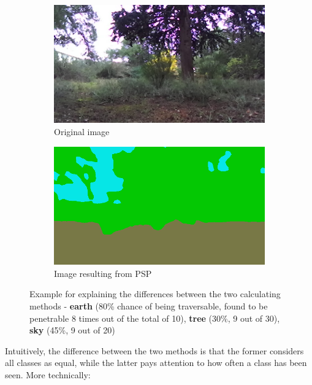 \documentclass[12pt,a4paper,table,dvipsnames,tikz]{report}
\newcommand{\acronym}{\MakeUppercase}
\newcommand{\class}[1]{\textbf{\textcolor{#1}{#1}}} %
\begin{document}
	\begin{figure}[h!]
		\centering
		\begin{subfigure}[b]{0.45\textwidth}
			\includegraphics[width=\textwidth]{44_40_0050or}
			\caption{Original image}
			\label{fig:meth:or}
		\end{subfigure}
		\begin{subfigure}[b]{0.45\textwidth}
			\includegraphics[width=\textwidth]{44_40_0050nn}
			\caption{Image resulting from \acronym{psp}}
			\label{fig:meth:nn}
		\end{subfigure}
		\caption{Example for explaining the differences between the two calculating methods - 
			\class{earth} (80\% chance of being traversable, found to be 
			penetrable 8 times out of the total of 10), \class{tree} (30\%, 9 out of 30), 
			\class{sky} (45\%, 9 out of 20)}
		\label{fig:meth}
	\end{figure}
	
	
	Intuitively, the difference between the two methods is that the former considers all 
	classes as equal, while the latter pays attention to how often a class has been seen. 
	More technically: 
	
\end{document}
